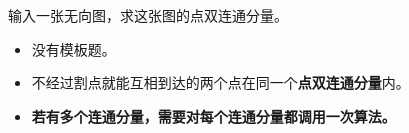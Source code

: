 \noindent 输入一张无向图，求这张图的点双连通分量。

\begin{itemize}
    \item 没有模板题。
    \item 不经过割点就能互相到达的两个点在同一个\textbf{点双连通分量}内。
    \item \textbf{若有多个连通分量，需要对每个连通分量都调用一次算法。}
\end{itemize}